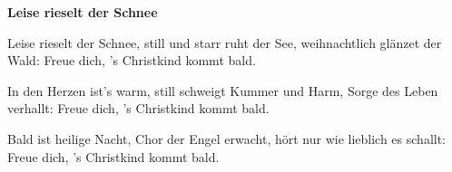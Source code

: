 \documentclass[10pt]{article}
\begin{document}
{\Large
\begin{guitar}
    \textbf{Leise rieselt der Schnee}


    Leise rieselt der Schnee,
    still und starr ruht der See,
    weihnachtlich glänzet der Wald:
    Freue dich, 's Christkind kommt bald.


    In den Herzen ist's warm,
    still schweigt Kummer und Harm,
    Sorge des Leben verhallt:
    Freue dich, 's Christkind kommt bald.


    Bald ist heilige Nacht,
    Chor der Engel erwacht,
    hört nur wie lieblich es schallt:
    Freue dich, 's Christkind kommt bald.
\end{guitar}
}
\end{document}
